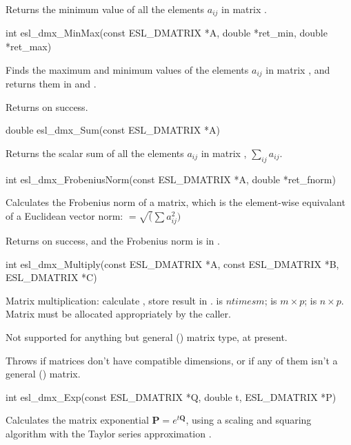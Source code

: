 \begin{sreapi}
Returns the minimum value of all the elements $a_{ij}$ in matrix .


\hypertarget{func:esl_dmx_MinMax()}
{\item[int esl\_dmx\_MinMax(const ESL\_DMATRIX *A, double *ret\_min, double *ret\_max)]}

Finds the maximum and minimum values of the
elements $a_{ij}$ in matrix , and returns
them in  and .

Returns  on success.            



\hypertarget{func:esl_dmx_Sum()}
{\item[double esl\_dmx\_Sum(const ESL\_DMATRIX *A)]}

Returns the scalar sum of all the elements $a_{ij}$ in matrix ,
$\sum_{ij} a_{ij}$.


\hypertarget{func:esl_dmx_FrobeniusNorm()}
{\item[int esl\_dmx\_FrobeniusNorm(const ESL\_DMATRIX *A, double *ret\_fnorm)]}

Calculates the Frobenius norm of a matrix, which
is the element-wise equivalant of a 
Euclidean vector norm: 
$ = \sqrt(\sum a_{ij}^2)$

Returns  on success, and the Frobenius norm
is in .


\hypertarget{func:esl_dmx_Multiply()}
{\item[int esl\_dmx\_Multiply(const ESL\_DMATRIX *A, const ESL\_DMATRIX *B, ESL\_DMATRIX *C)]}

Matrix multiplication: calculate , store result in .
 is $n times m$;  is $m \times p$;  is $n \times p$.
Matrix  must be allocated appropriately by the caller.

Not supported for anything but general ()
matrix type, at present.

Throws  if matrices don't have compatible dimensions,
or if any of them isn't a general () matrix.


\hypertarget{func:esl_dmx_Exp()}
{\item[int esl\_dmx\_Exp(const ESL\_DMATRIX *Q, double t, ESL\_DMATRIX *P)]}

Calculates the matrix exponential $\mathbf{P} = e^{t\mathbf{Q}}$,
using a scaling and squaring algorithm with
the Taylor series approximation \citep{MolerVanLoan03}.


\end{sreapi}
